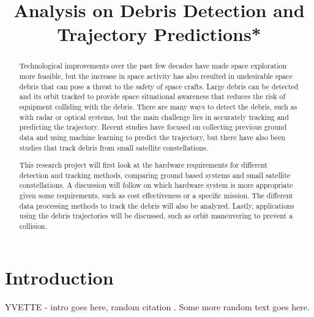 \documentclass[conference]{IEEEtran}
\begin{document}
	
	\title{Analysis on Debris Detection and Trajectory Predictions*}

	\author{
	}

	\maketitle
	
	\begin{abstract}
		  
		Technological improvements over the past few decades have made space exploration more feasible, but the increase in space activity has also resulted in undesirable space debris that can pose a threat to the safety of space crafts. Large debris can be detected and its orbit tracked to provide space situational awareness that reduces the risk of equipment colliding with the debris. There are many ways to detect the debris, such as with radar or optical systems, but the main challenge lies in accurately tracking and predicting the trajectory. Recent studies have focused on collecting previous ground data and using machine learning to predict the trajectory, but there have also been studies that track debris from small satellite constellations. \
		
		This research project will first look at the hardware requirements for different detection and tracking methods, comparing ground based systems and small satellite constellations. A discussion will follow on which hardware system is more appropriate given some requirements, such as cost effectiveness or a specific mission. The different data processing methods to track the debris will also be analyzed. Lastly, applications using the debris trajectories will be discussed, such as orbit maneuvering to prevent a collision.\cite{2013_orbit_pred}

	\end{abstract}

	\section{Introduction}
	
	YVETTE - intro goes here, random citation \cite{2019_lidar}. Some more random text goes here.


	\nocite{*}
	\printbibliography
	
\end{document}
